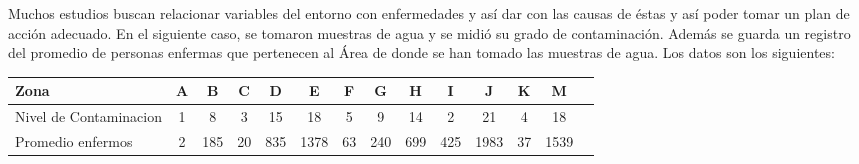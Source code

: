 Muchos estudios buscan relacionar variables del entorno con enfermedades y as\'i dar con las causas de
\'estas y as\'i poder tomar un plan de acci\'on adecuado. En el siguiente caso, se tomaron muestras de agua
y se midi\'o su grado de contaminaci\'on. Adem\'as se guarda un registro del promedio de personas enfermas
que pertenecen al \'Area de donde se han tomado las muestras de agua. Los datos son los siguientes:\\
\begin{tabular}{|l|c|c|c|c|c|c|c|c|c|c|c|c|r|}
	\hline
     Zona                   & A & B   & C  & D   & E    & F  & G   & H   & I   & J    & K  & M \\  \hline
     Nivel de Contaminacion & 1 & 8   & 3  & 15  & 18   & 5  & 9   & 14  & 2   & 21   & 4  & 18 \\  \hline
     Promedio enfermos      & 2 & 185 & 20 & 835 & 1378 & 63 & 240 & 699 & 425 & 1983 & 37 & 1539 \\ \hline
\end{tabular}\\
